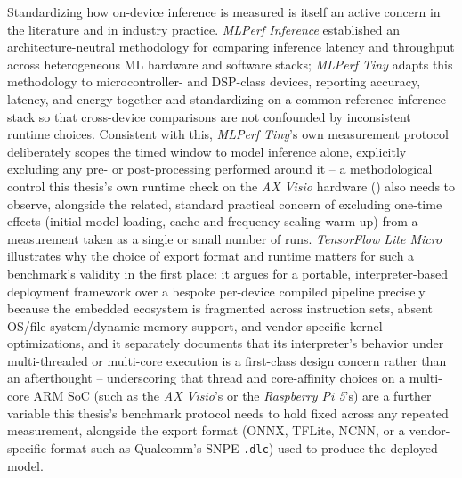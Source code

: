 Standardizing how on-device inference is measured is itself an active concern in the literature and in industry practice. \textit{MLPerf Inference} \cite{reddiMLPerfInferenceBenchmark2020} established an architecture-neutral methodology for comparing inference latency and throughput across heterogeneous ML hardware and software stacks; \textit{MLPerf Tiny} \cite{banburyMLPerfTinyBenchmark2021} adapts this methodology to microcontroller- and DSP-class devices, reporting accuracy, latency, and energy together and standardizing on a common reference inference stack so that cross-device comparisons are not confounded by inconsistent runtime choices. Consistent with this, \textit{MLPerf Tiny}'s own measurement protocol deliberately scopes the timed window to model inference alone, explicitly excluding any pre- or post-processing performed around it -- a methodological control this thesis's own runtime check on the \textit{AX Visio} hardware () also needs to observe, alongside the related, standard practical concern of excluding one-time effects (initial model loading, cache and frequency-scaling warm-up) from a measurement taken as a single or small number of runs. \textit{TensorFlow Lite Micro} \cite{davidTensorFlowLiteMicro2021} illustrates why the choice of export format and runtime matters for such a benchmark's validity in the first place: it argues for a portable, interpreter-based deployment framework over a bespoke per-device compiled pipeline precisely because the embedded ecosystem is fragmented across instruction sets, absent OS/file-system/dynamic-memory support, and vendor-specific kernel optimizations, and it separately documents that its interpreter's behavior under multi-threaded or multi-core execution is a first-class design concern rather than an afterthought -- underscoring that thread and core-affinity choices on a multi-core ARM SoC (such as the \textit{AX Visio}'s or the \textit{Raspberry Pi 5}'s) are a further variable this thesis's benchmark protocol needs to hold fixed across any repeated measurement, alongside the export format (ONNX, TFLite, NCNN, or a vendor-specific format such as Qualcomm's SNPE \texttt{.dlc}) used to produce the deployed model.

